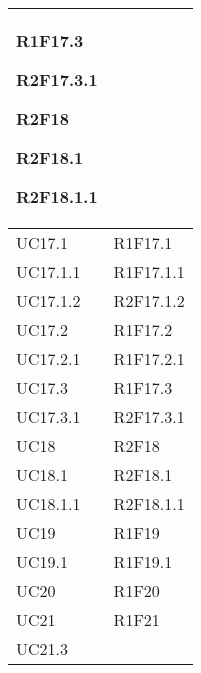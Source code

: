 \begin{center}
\begin{longtable}{|p{44mm}|p{22mm}|}
R1F17.3 \newline

R2F17.3.1 \newline

R2F18 \newline

R2F18.1 \newline

R2F18.1.1 \newline
\\
\hline
UC17.1 &

R1F17.1 \newline
\\
\hline
UC17.1.1 &

R1F17.1.1 \newline
\\
\hline
UC17.1.2 &

R2F17.1.2 \newline
\\
\hline
UC17.2 &

R1F17.2 \newline
\\
\hline
UC17.2.1 &

R1F17.2.1 \newline
\\
\hline
UC17.3 &

R1F17.3 \newline
\\
\hline
UC17.3.1 &

R2F17.3.1 \newline
\\
\hline
UC18 &

R2F18 \newline
\\
\hline
UC18.1 &

R2F18.1 \newline
\\
\hline
UC18.1.1 &

R2F18.1.1 \newline
\\
\hline
UC19 &

R1F19 \newline
\\
\hline
UC19.1 &

R1F19.1 \newline
\\
\hline
UC20 &

R1F20 \newline
\\
\hline
UC21 &

R1F21 \newline
\\
\hline
UC21.3 &


\end{longtable}
\end{center}
